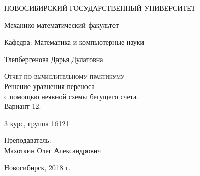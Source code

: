 	\begin{titlepage}
		\begin{center}
			
			\vspace{0.5cm}
			
			НОВОСИБИРСКИЙ ГОСУДАРСТВЕННЫЙ УНИВЕРСИТЕТ
			\vspace{0.25cm}
			
			Механико-математический факультет
			
			Кафедра: Математика и компьютерные науки
			\vfill
			
			
			Тлепбергенова Дарья Дулатовна
			\vfill
			
			\textsc{Отчет по вычислительному практикуму}\\[5mm]
			
			{\LARGE Решение уравнения переноса\\
				с помощью неявной схемы бегущего счета.\\
				Вариант 12.\\[2mm]}
			\bigskip
			
			3 курс, группа 16121
		\end{center}
		\vfill
		\newlength{\ML}
		\hfill\begin{minipage}{0.4\textwidth}
			Преподаватель:\\
			Махоткин Олег Александрович
		\end{minipage}%
		\bigskip
		
		\vfill
		\begin{center}
			Новосибирск, 2018 г.
		\end{center}
	\end{titlepage}
	